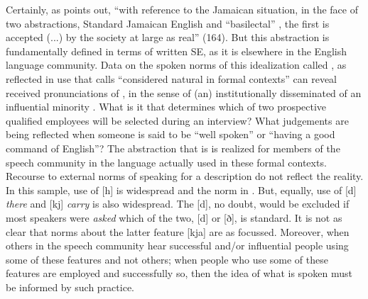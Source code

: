 Certainly, as \citet{Devonish2003} points out, “with reference to the Jamaican situation, in the face of two abstractions, Standard Jamaican English and ``basilectal'' , the first is accepted (...) by the society at large as real” (164).  But this abstraction is fundamentally defined in terms of written SE, as it is elsewhere in the English language community.  Data on the spoken norms of this idealization called , as reflected in use that \citet[lvi]{Allsopp1996} calls “considered natural in formal contexts” can reveal received pronunciations of , in the sense of (an) institutionally disseminated  of an influential minority \citep[31]{Yallop1999}.  What is it that determines which of two prospective qualified employees will be selected during an interview?  What judgements are being reflected when someone is said to be “well spoken” or “having a good command of English”?  The abstraction that is  is realized for members of the speech community in the language actually used in these formal contexts.  Recourse to external norms of speaking for a description do not reflect the reality.  In this sample, use of [h] is widespread and the norm in .  But, equally, use of [d] \textit{there} and [kj] \textit{carry} is also widespread.  The [d], no doubt, would be excluded if most speakers were \textit{asked} which of the two, [d] or [ð], is standard.  It is not as clear that norms about the latter feature [kja] are as focussed.  Moreover, when others in the speech community hear successful and/or influential people using some of these features and not others; when people who use some of these features are employed and successfully so, then the idea of what is spoken  must be informed by such practice.
